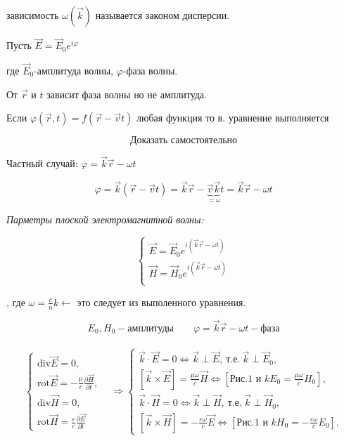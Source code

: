 зависимость \( \omega (\vec{k}) \)  называется законом дисперсии.

Пусть \( \vec{E}=\vec{E}_0 e^{i\varphi}\)

где \( \vec{E}_0 \)-амплитуда волны, \( \varphi \)-фаза волны.

От \( \vec{r} \) и \( t \) зависит фаза волны но не амплитуда.

Если \(\varphi(\vec{r},t)=f(\vec{r}-\vec{v}t) \) любая функция то в. уравнение выполняется 

\[
\boxed{\text{Доказать самостоятельно}}
\]

Частный случай: \( \varphi=\vec{k}\vec{r}-\omega t \) 

\[
\varphi=\vec{k}(\vec{r}-\vec{v}t)=\vec{k}\vec{r}-\underbrace{\vec{v}\vec{k}}_{=\omega}t=\vec{k}\vec{r}-\omega t 
\]

\textit{Парметры плоской электромагнитной волны:}

\[
\begin{cases}
    \vec{E}=\vec{E}_0e^{i(\vec{k}\vec{r}-\omega t)} \\
    \vec{H}=\vec{H}_0e^{i(\vec{k}\vec{r}-\omega t)} \\
\end{cases}
\]

, где \( \omega=\frac{c}{n}k \leftarrow  \) это следует из выполенного уравнения.

\[
E_0,H_0 -\text{амплитуды}   \qquad \varphi=\vec{k}\vec{r}-\omega t - \text{фаза}
\]

\[
\begin{aligned}
    \begin{array}{rl}
        \begin{cases}
            \mathrm{div}\vec{E} = 0, \\
            \mathrm{rot}\vec{E} = -\frac{\mu}{c} \frac{\partial \vec{H}}{\partial t}, \\
            \mathrm{div}\vec{H} = 0, \\
            \mathrm{rot}\vec{H} = \frac{\varepsilon}{c} \frac{\partial \vec{E}}{\partial t}
        \end{cases} 
        & \Rightarrow
        \begin{cases}
            \vec{k} \cdot \vec{E} = 0 \Leftrightarrow \vec{k} \perp \vec{E},\ \text{т.е.}\ \vec{k} \perp \vec{E}_0, \\
            [\vec{k} \times \vec{E}] = \frac{\mu\omega}{c} \vec{H} \Leftrightarrow [\text{Рис.1 и } kE_0 = \frac{\mu\omega}{c}H_0], \\
            \vec{k} \cdot \vec{H} = 0 \Leftrightarrow \vec{k} \perp \vec{H},\ \text{т.е.}\ \vec{k} \perp \vec{H}_0, \\
            [\vec{k} \times \vec{H}] = -\frac{\varepsilon\omega}{c} \vec{E} \Leftrightarrow [\text{Рис.1 и } kH_0 = -\frac{\varepsilon\omega}{c}E_0].
        \end{cases}
    \end{array}
\end{aligned}
\]

